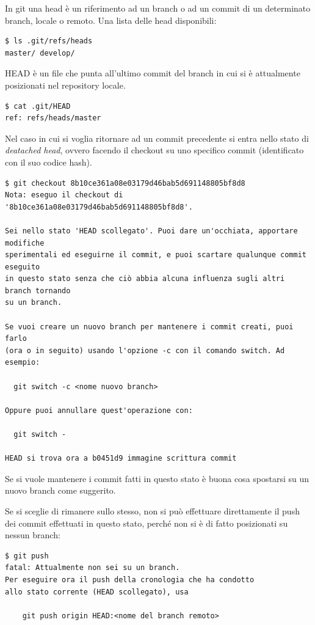 \documentclass{article} \usepackage[textwidth=19cm,textheight=24cm]{geometry}
\begin{document}
In git una head è un riferimento ad un branch o ad un commit di un determinato
branch, locale o remoto. Una lista delle head disponibili:

\begin{verbatim}
$ ls .git/refs/heads
master/ develop/
\end{verbatim}

HEAD è un file che punta all'ultimo commit del branch in cui si è attualmente
posizionati nel repository locale.

\begin{verbatim}
$ cat .git/HEAD
ref: refs/heads/master
\end{verbatim}

Nel caso in cui si voglia ritornare ad un commit precedente si entra nello stato
di \emph{deatached head}, ovvero facendo il checkout su uno specifico commit
(identificato con il suo codice hash).

\begin{verbatim}
$ git checkout 8b10ce361a08e03179d46bab5d691148805bf8d8
Nota: eseguo il checkout di '8b10ce361a08e03179d46bab5d691148805bf8d8'.

Sei nello stato 'HEAD scollegato'. Puoi dare un'occhiata, apportare modifiche
sperimentali ed eseguirne il commit, e puoi scartare qualunque commit eseguito
in questo stato senza che ciò abbia alcuna influenza sugli altri branch tornando
su un branch.

Se vuoi creare un nuovo branch per mantenere i commit creati, puoi farlo
(ora o in seguito) usando l'opzione -c con il comando switch. Ad esempio:

  git switch -c <nome nuovo branch>

Oppure puoi annullare quest'operazione con:

  git switch -

HEAD si trova ora a b0451d9 immagine scrittura commit
\end{verbatim}

Se si vuole mantenere i commit fatti in questo stato è buona cosa spostarsi su
un nuovo branch come suggerito.

Se si sceglie di rimanere sullo stesso, non si può effettuare direttamente il push dei
commit effettuati in questo stato, perché non si è di fatto posizionati su nessun branch:

\begin{verbatim}
$ git push
fatal: Attualmente non sei su un branch.
Per eseguire ora il push della cronologia che ha condotto
allo stato corrente (HEAD scollegato), usa

    git push origin HEAD:<nome del branch remoto>
\end{verbatim}
\end{document}
